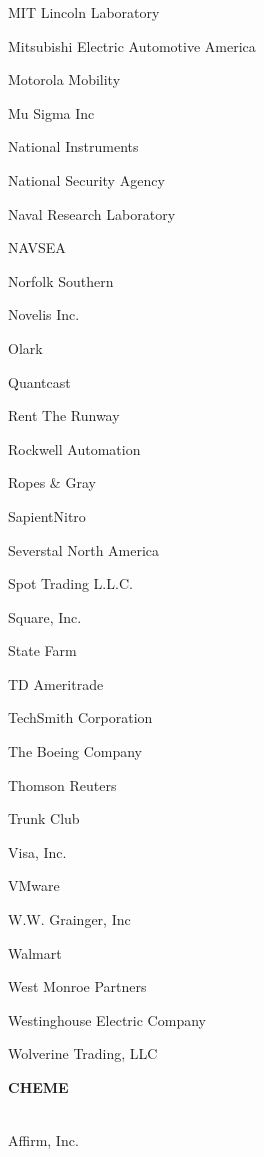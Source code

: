 \documentclass[twoside]{article}
\begin{document}
\begin{center}
\begin{multicols}{5}
\begin{FlushLeft}
\begin{compactitem}
\item MIT Lincoln Laboratory
\item Mitsubishi Electric Automotive America
\item Motorola Mobility
\item Mu Sigma Inc
\item National Instruments
\item National Security Agency
\item Naval Research Laboratory
\item NAVSEA
\item Norfolk Southern
\item Novelis Inc.
\item Olark
\item Quantcast
\item Rent The Runway
\item Rockwell Automation
\item Ropes \& Gray
\item SapientNitro
\item Severstal North America
\item Spot Trading L.L.C.
\item Square, Inc.
\item State Farm
\item TD Ameritrade
\item TechSmith Corporation
\item The Boeing Company
\item Thomson Reuters
\item Trunk Club
\item Visa, Inc.
\item VMware
\item W.W. Grainger, Inc
\item Walmart
\item West Monroe Partners
\item Westinghouse Electric Company
\item Wolverine Trading, LLC
\end{compactitem}
        \end{FlushLeft}
        \vspace{1em}
        {\fontsize{14}{16}\selectfont \bf CHEME}\\
        \vspace{-1em}
        ~\hrulefill~
        \vspace{-.9em}
        \begin{FlushLeft}
        \begin{compactitem}
        \item Affirm, Inc.

\end{compactitem}
\end{FlushLeft}
\end{multicols}
\end{center}
\end{document}
